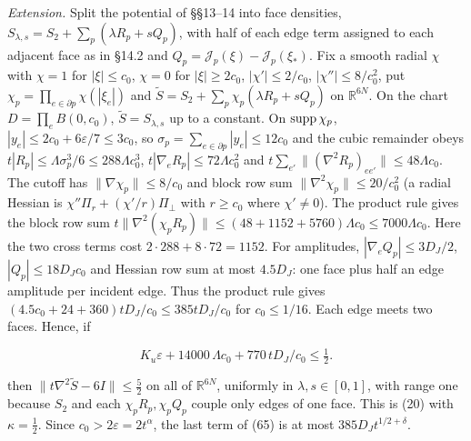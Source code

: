 \documentclass[11pt,a4paper]{article}
\begin{document}
\emph{Extension.} Split the potential of §§13--14 into face densities,
\(S_{\lambda,s}=S_2+\sum_p(\lambda R_p+sQ_p)\), with half of each edge
term assigned to each adjacent face as in §14.2 and
\(Q_p=\mathcal J_p(\xi)-\mathcal J_p(\xi_*)\). Fix a smooth radial
\(\chi\) with \(\chi=1\) for \(|\xi|\le c_0\), \(\chi=0\) for
\(|\xi|\ge2c_0\), \(|\chi'|\le2/c_0\), \(|\chi''|\le8/c_0^2\), put
\(\chi_p=\prod_{e\in\partial p}\chi(|\xi_e|)\) and
\(\tilde S=S_2+\sum_p\chi_p(\lambda R_p+sQ_p)\) on \(\mathbb R^{6N}\).
On the chart \(D=\prod_eB(0,c_0)\), \(\tilde S=S_{\lambda,s}\) up to a
constant. On \({\rm supp}\,\chi_p\),
\(|y_e|\le2c_0+6\varepsilon/7\le3c_0\), so
\(\sigma_p=\sum_{e\in\partial p}|y_e|\le12c_0\) and the cubic remainder
obeys \(t|R_p|\le\Lambda\sigma_p^3/6\le288\Lambda c_0^3\),
\(t|\nabla_eR_p|\le72\Lambda c_0^2\) and
\(t\sum_{e'}\|(\nabla^2R_p)_{ee'}\|\le48\Lambda c_0\). The cutoff has
\(\|\nabla\chi_p\|\le8/c_0\) and block row sum
\(\|\nabla^2\chi_p\|\le20/c_0^2\) (a radial Hessian is
\(\chi''\Pi_r+(\chi'/r)\Pi_\perp\) with \(r\ge c_0\) where
\(\chi'\ne0\)). The product rule gives the block row sum
\(t\|\nabla^2(\chi_pR_p)\|\le (48+1152+5760)\Lambda c_0\le7000\Lambda c_0\).
Here the two cross terms cost \(2\cdot288+8\cdot72=1152\). For
amplitudes, \(|\nabla_eQ_p|\le3D_J/2\), \(|Q_p|\le18D_Jc_0\) and Hessian
row sum at most \(4.5D_J\): one face plus half an edge amplitude per
incident edge. Thus the product rule gives
\((4.5c_0+24+360)tD_J/c_0\le385tD_J/c_0\) for \(c_0\le1/16\). Each edge
meets two faces. Hence, if

\[K_u\varepsilon+14000\,\Lambda c_0+770\,tD_J/c_0\le\tfrac12.\tag{65}\]

then \(\|t\nabla^2\tilde S-6I\|\le\frac52\) on all of
\(\mathbb R^{6N}\), uniformly in \(\lambda,s\in[0,1]\), with range one
because \(S_2\) and each \(\chi_pR_p,\chi_pQ_p\) couple only edges of
one face. This is (20) with \(\kappa=\frac12\). Since
\(c_0>2\varepsilon=2t^\alpha\), the last term of (65) is at most
\(385D_Jt^{1/2+\delta}\).
\end{document}
